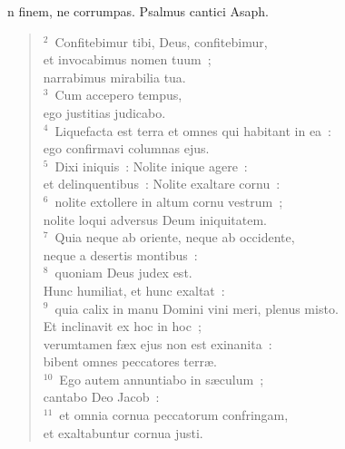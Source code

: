 \bchapter[Psalm]
n finem, ne corrumpas. Psalmus cantici Asaph.
\begin{verse}${}^{2}$~Confitebimur tibi, Deus, confitebimur,\\ et invocabimus nomen tuum~;\\ narrabimus mirabilia tua.\\
${}^{3}$~Cum accepero tempus,\\ ego justitias judicabo.\\
${}^{4}$~Liquefacta est terra et omnes qui habitant in ea~:\\ ego confirmavi columnas ejus.\\
${}^{5}$~Dixi iniquis~: Nolite inique agere~:\\ et delinquentibus~: Nolite exaltare cornu~:\\
${}^{6}$~nolite extollere in altum cornu vestrum~;\\ nolite loqui adversus Deum iniquitatem.\\
${}^{7}$~Quia neque ab oriente, neque ab occidente,\\ neque a desertis montibus~:\\
${}^{8}$~quoniam Deus judex est.\\ Hunc humiliat, et hunc exaltat~:\\
${}^{9}$~quia calix in manu Domini vini meri, plenus misto.\\ Et inclinavit ex hoc in hoc~;\\ verumtamen f\ae x ejus non est exinanita~:\\ bibent omnes peccatores terr\ae .\\
${}^{10}$~Ego autem annuntiabo in s\ae culum~;\\ cantabo Deo Jacob~:\\
${}^{11}$~et omnia cornua peccatorum confringam,\\ et exaltabuntur cornua justi.\end{verse}



